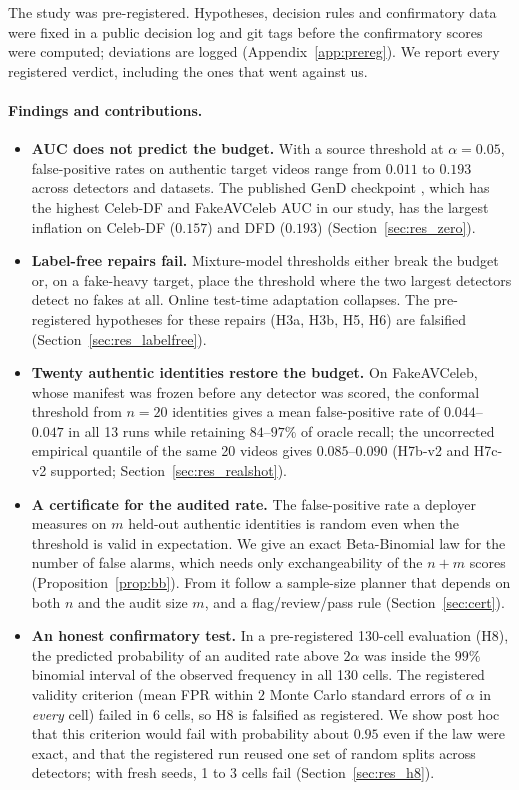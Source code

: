 The study was pre-registered. Hypotheses, decision rules and confirmatory data were fixed in a public decision log and git tags before the confirmatory scores were computed; deviations are logged (Appendix~\ref{app:prereg}). We report every registered verdict, including the ones that went against us.

\paragraph{Findings and contributions.}
\begin{itemize}[leftmargin=*,itemsep=2pt]
    \item \textbf{AUC does not predict the budget.} With a source threshold at $\alpha=0.05$, false-positive rates on authentic target videos range from $0.011$ to $0.193$ across detectors and datasets. The published GenD checkpoint \citep{yermakov2026gend}, which has the highest Celeb-DF and FakeAVCeleb AUC in our study, has the largest inflation on Celeb-DF ($0.157$) and DFD ($0.193$) (Section~\ref{sec:res_zero}).
    \item \textbf{Label-free repairs fail.} Mixture-model thresholds either break the budget or, on a fake-heavy target, place the threshold where the two largest detectors detect no fakes at all. Online test-time adaptation collapses. The pre-registered hypotheses for these repairs (H3a, H3b, H5, H6) are falsified (Section~\ref{sec:res_labelfree}).
    \item \textbf{Twenty authentic identities restore the budget.} On FakeAVCeleb, whose manifest was frozen before any detector was scored, the conformal threshold from $n=20$ identities gives a mean false-positive rate of $0.044$--$0.047$ in all 13 runs while retaining $84$--$97\%$ of oracle recall; the uncorrected empirical quantile of the same 20 videos gives $0.085$--$0.090$ (H7b-v2 and H7c-v2 supported; Section~\ref{sec:res_realshot}).
    \item \textbf{A certificate for the audited rate.} The false-positive rate a deployer measures on $m$ held-out authentic identities is random even when the threshold is valid in expectation. We give an exact Beta-Binomial law for the number of false alarms, which needs only exchangeability of the $n+m$ scores (Proposition~\ref{prop:bb}). From it follow a sample-size planner that depends on both $n$ and the audit size $m$, and a flag/review/pass rule (Section~\ref{sec:cert}).
    \item \textbf{An honest confirmatory test.} In a pre-registered 130-cell evaluation (H8), the predicted probability of an audited rate above $2\alpha$ was inside the $99\%$ binomial interval of the observed frequency in all 130 cells. The registered validity criterion (mean FPR within $2$ Monte Carlo standard errors of $\alpha$ in \emph{every} cell) failed in 6 cells, so H8 is falsified as registered. We show post hoc that this criterion would fail with probability about $0.95$ even if the law were exact, and that the registered run reused one set of random splits across detectors; with fresh seeds, 1 to 3 cells fail (Section~\ref{sec:res_h8}).
\end{itemize}

